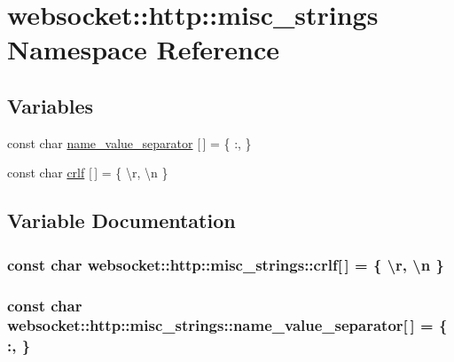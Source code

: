 \hypertarget{namespacewebsocket_1_1http_1_1misc__strings}{}\section{websocket\+:\+:http\+:\+:misc\+\_\+strings Namespace Reference}
\label{namespacewebsocket_1_1http_1_1misc__strings}
\subsection*{Variables}
\begin{DoxyCompactItemize}
\item 
const char \hyperlink{namespacewebsocket_1_1http_1_1misc__strings_a8fede78f1be63335d445aabd0277727e}{name\+\_\+value\+\_\+separator} \mbox{[}$\,$\mbox{]} = \{ \textquotesingle{}\+:\textquotesingle{}, \textquotesingle{} \textquotesingle{} \}
\item 
const char \hyperlink{namespacewebsocket_1_1http_1_1misc__strings_a570bafe7096a0c7904f41f8d6ada54af}{crlf} \mbox{[}$\,$\mbox{]} = \{ \textquotesingle{}\textbackslash{}r\textquotesingle{}, \textquotesingle{}\textbackslash{}n\textquotesingle{} \}
\end{DoxyCompactItemize}


\subsection{Variable Documentation}
\subsubsection[{\texorpdfstring{crlf}{crlf}}]{\setlength{\rightskip}{0pt plus 5cm}const char websocket\+::http\+::misc\+\_\+strings\+::crlf\mbox{[}$\,$\mbox{]} = \{ \textquotesingle{}\textbackslash{}r\textquotesingle{}, \textquotesingle{}\textbackslash{}n\textquotesingle{} \}}\hypertarget{namespacewebsocket_1_1http_1_1misc__strings_a570bafe7096a0c7904f41f8d6ada54af}{}\label{namespacewebsocket_1_1http_1_1misc__strings_a570bafe7096a0c7904f41f8d6ada54af}
\subsubsection[{\texorpdfstring{name\+\_\+value\+\_\+separator}{name_value_separator}}]{\setlength{\rightskip}{0pt plus 5cm}const char websocket\+::http\+::misc\+\_\+strings\+::name\+\_\+value\+\_\+separator\mbox{[}$\,$\mbox{]} = \{ \textquotesingle{}\+:\textquotesingle{}, \textquotesingle{} \textquotesingle{} \}}\hypertarget{namespacewebsocket_1_1http_1_1misc__strings_a8fede78f1be63335d445aabd0277727e}{}\label{namespacewebsocket_1_1http_1_1misc__strings_a8fede78f1be63335d445aabd0277727e}

